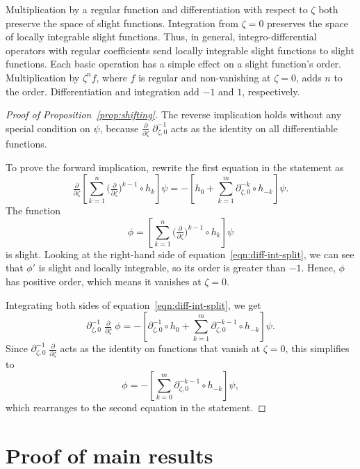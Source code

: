 \documentclass{article}
\newcommand{\fracderiv}[3]{\partial^{#1}_{#2, #3}}
\begin{document}
Multiplication by a regular function and differentiation with respect to $\zeta$ both preserve the space of slight functions. Integration from $\zeta = 0$ preserves the space of locally integrable slight functions. Thus, in general, integro-differential operators with regular coefficients send locally integrable slight functions to slight functions. Each basic operation has a simple effect on a slight function's order. Multiplication by $\zeta^n f$, where $f$ is regular and non-vanishing at $\zeta = 0$, adds $n$ to the order. Differentiation and integration add $-1$ and $1$, respectively.
\begin{proof}[Proof of Proposition~\ref{prop:shifting}]
The reverse implication holds without any special condition on $\psi$, because $\tfrac{\partial}{\partial \zeta}\;\fracderiv{-1}{\zeta}{0}$ acts as the identity on all differentiable functions.

To prove the forward implication, rewrite the first equation in the statement as
\begin{equation}\label{eqn:diff-int-split}
\tfrac{\partial}{\partial \zeta} \left[ \sum_{k = 1}^n \big(\tfrac{\partial}{\partial \zeta}\big)^{k-1} \circ h_k \right] \psi = -\left[ h_0 + \sum_{k = 1}^m \fracderiv{-k}{\zeta}{0} \circ h_{-k} \right] \psi.
\end{equation}
The function
\[ \phi = \left[ \sum_{k = 1}^n \big(\tfrac{\partial}{\partial \zeta}\big)^{k-1} \circ h_k \right] \psi \]
is slight. Looking at the right-hand side of equation~\ref{eqn:diff-int-split}, we can see that $\phi'$ is slight and locally integrable, so its order is greater than $-1$. Hence, $\phi$ has positive order, which means it vanishes at $\zeta = 0$.

Integrating both sides of equation~\ref{eqn:diff-int-split}, we get
\[ \fracderiv{-1}{\zeta}{0}\;\tfrac{\partial}{\partial \zeta}\;\phi = -\left[ \fracderiv{-1}{\zeta}{0} \circ h_0 + \sum_{k = 1}^m \fracderiv{-k-1}{\zeta}{0} \circ h_{-k} \right] \psi. \]
Since $\fracderiv{-1}{\zeta}{0}\;\tfrac{\partial}{\partial \zeta}$ acts as the identity on functions that vanish at $\zeta = 0$, this simplifies to
\[ \phi = -\left[ \sum_{k = 0}^m \fracderiv{-k-1}{\zeta}{0} \circ h_{-k} \right] \psi, \]
which rearranges to the second equation in the statement.
\end{proof}

\section{Proof of main results}
\end{document}

